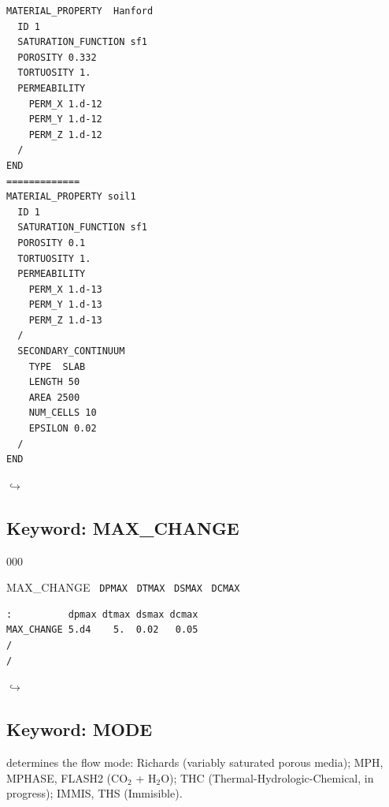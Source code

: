 \documentclass[12pt]{article}
\newcommand\return{{\hfill$\hookrightarrow$}}
\begin{document}

\begin{verbatim}
MATERIAL_PROPERTY  Hanford
  ID 1
  SATURATION_FUNCTION sf1
  POROSITY 0.332
  TORTUOSITY 1.
  PERMEABILITY
    PERM_X 1.d-12
    PERM_Y 1.d-12
    PERM_Z 1.d-12
  /
END
=============
MATERIAL_PROPERTY soil1
  ID 1 
  SATURATION_FUNCTION sf1
  POROSITY 0.1
  TORTUOSITY 1.
  PERMEABILITY
    PERM_X 1.d-13
    PERM_Y 1.d-13
    PERM_Z 1.d-13
  /
  SECONDARY_CONTINUUM
    TYPE  SLAB
    LENGTH 50
    AREA 2500
    NUM_CELLS 10
    EPSILON 0.02
  /
END
\end{verbatim}

\hyperlink{target_key}{\return}


\newpage
\protect\hypertarget{target_max}{}

\subsection{Keyword: MAX\_CHANGE}


\begin{deflist}{000}
\item[MAX\_CHANGE] \ {\tt DPMAX} \ {\tt DTMAX} \ {\tt DSMAX} \ {\tt DCMAX}
\end{deflist}


\begin{verbatim}
:          dpmax dtmax dsmax dcmax
MAX_CHANGE 5.d4    5.  0.02   0.05
/
/
\end{verbatim}

\hyperlink{target_key}{\return}


\newpage
\protect\hypertarget{target_mode}{}

\subsection{Keyword: MODE}

 determines the flow mode: Richards (variably saturated porous media); MPH, \linebreak MPHASE, FLASH2 (CO$_2$ + H$_2$O); THC (Thermal-Hydrologic-Chemical, in pro\-gress); IMMIS, THS (Immisible).
\end{document}

